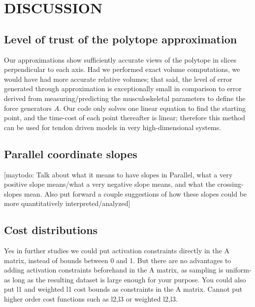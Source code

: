 \section{DISCUSSION}

\subsection{Level of trust of the polytope approximation} %
\label{sub:level_of_trust_of_the_polytope_approximation}

Our approximations show sufficiently accurate views of the polytope in slices perpendicular to each axis. Had we performed exact volume computations, we would have had more accurate relative volumes; that said, the level of error generated through approximation is exceptionally small in comparison to error derived from measuring/predicting the musculoskeletal parameters to define the force generators $A$. Our code only solves one linear equation to find the starting point, and the time-cost of each point thereafter is linear; therefore this method can be used for tendon driven models in very high-dimensional systems.


\subsection{Parallel coordinate slopes} %
\label{sec:parallel_coordinate_slopes}
[maytodo: Talk about what it means to have slopes in Parallel, what a very positive slope means/what a very negative slope means, and what the crossing-slopes mean. Also put forward a couple suggestions of how these slopes could be more quantitatively interpreted/analyzed]

\subsection{Cost distributions} %
\label{sec:cost_distributions}
Yes in further studies we could put activation constraints directly in the A matrix, instead of bounds between 0 and 1. But there are no advantages to adding activation constraints beforehand in the A matrix, as sampling is uniform- as long as the resulting dataset is large enough for your purpose.
You could also put l1 and weighted l1 cost bounds as constraints in the A matrix. Cannot put higher order cost functions such as l2,l3 or weighted l2,l3.
\\

